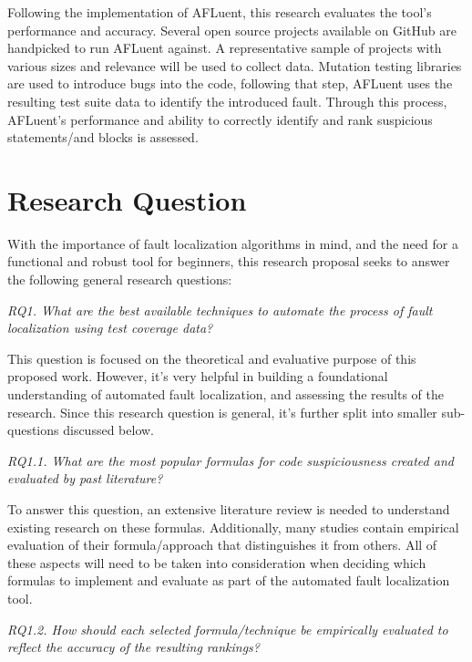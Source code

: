 Following the implementation of AFLuent, this research evaluates the
tool's performance and accuracy. Several open source projects
available on GitHub are handpicked to run AFLuent against. A representative
sample of projects with various sizes and relevance will be used to collect
data. Mutation testing libraries are used to introduce bugs into the code,
following that step, AFLuent uses the resulting test suite data to identify the
introduced fault. Through this process, AFLuent's performance and ability to
correctly identify and rank suspicious statements/and blocks is assessed.

\section{Research Question}
\label{sec:researchq}

With the importance of fault localization algorithms in mind, and the need for a
functional and robust tool for beginners, this research proposal
seeks to answer the following general research questions:

\begin{center}
	\emph{RQ1. What are the best available techniques to automate the process of
	fault localization using test coverage data?
	}
\end{center}

This question is focused on the theoretical and evaluative purpose of this
proposed work. However, it's very helpful in building a foundational
understanding of automated fault localization, and assessing the results of the
research. Since this research question is general, it's further split into
smaller sub-questions discussed below.

\begin{center}
	\emph{RQ1.1. What are the most popular formulas for code suspiciousness
	created and evaluated by past literature?
	}
\end{center}

To answer this question, an extensive literature review is needed to understand
existing research on these formulas. Additionally, many studies contain
empirical evaluation of their formula/approach that distinguishes it from
others. All of these aspects will need to be taken into consideration when
deciding which formulas to implement and evaluate as part of the automated fault
localization tool.

\begin{center}
	\emph{RQ1.2. How should each selected formula/technique be empirically
	evaluated to reflect the accuracy of the resulting rankings?
	}
\end{center}

